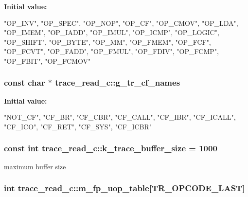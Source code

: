 \label{classtrace__read__c_ac4d2f34707899a37bf014db6c326ccba}
{\bfseries Initial value:}
\begin{DoxyCode}
 {
  "OP_INV",       
  "OP_SPEC",      
  "OP_NOP",       
  "OP_CF",       
  "OP_CMOV",      
  "OP_LDA",         
  "OP_IMEM",      
  "OP_IADD",      
  "OP_IMUL",      
  "OP_ICMP",      
  "OP_LOGIC",      
  "OP_SHIFT",      
  "OP_BYTE",      
  "OP_MM",       
  "OP_FMEM",      
  "OP_FCF",
  "OP_FCVT",      
  "OP_FADD",      
  "OP_FMUL",      
  "OP_FDIV",      
  "OP_FCMP",      
  "OP_FBIT",      
  "OP_FCMOV"        
}
\end{DoxyCode}
\hypertarget{classtrace__read__c_aef64643d21fa5c4c5b76f3f2f61fd391}{
\subsubsection[{g\_\-tr\_\-cf\_\-names}]{\setlength{\rightskip}{0pt plus 5cm}const char $\ast$ trace\_\-read\_\-c::g\_\-tr\_\-cf\_\-names}}
\label{classtrace__read__c_aef64643d21fa5c4c5b76f3f2f61fd391}
{\bfseries Initial value:}
\begin{DoxyCode}
 {
  "NOT_CF",       
  "CF_BR",       
  "CF_CBR",       
  "CF_CALL",      
  "CF_IBR",       
  "CF_ICALL",      
  "CF_ICO",       
  "CF_RET",       
  "CF_SYS",
  "CF_ICBR"
}
\end{DoxyCode}
\hypertarget{classtrace__read__c_a8853b7e1571b86ffba1ee31b185d0e91}{
\subsubsection[{k\_\-trace\_\-buffer\_\-size}]{\setlength{\rightskip}{0pt plus 5cm}const int {\bf trace\_\-read\_\-c::k\_\-trace\_\-buffer\_\-size} = 1000}}
\label{classtrace__read__c_a8853b7e1571b86ffba1ee31b185d0e91}
maximum buffer size \hypertarget{classtrace__read__c_a71e9a814021a699d19a3b61fdc53d9f4}{
\subsubsection[{m\_\-fp\_\-uop\_\-table}]{\setlength{\rightskip}{0pt plus 5cm}int {\bf trace\_\-read\_\-c::m\_\-fp\_\-uop\_\-table}\mbox{[}TR\_\-OPCODE\_\-LAST\mbox{]}}}
